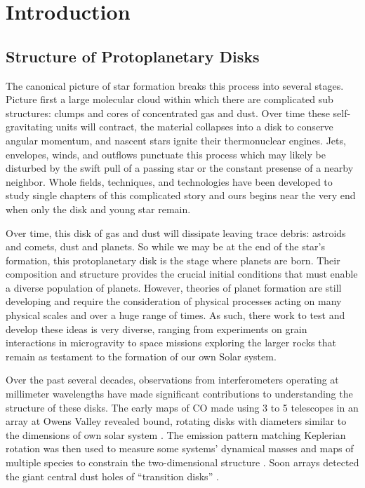 \chapter{Introduction}\label{chapter:introduction}

\section{Structure of Protoplanetary Disks}

The canonical picture of star formation breaks this process into several stages.  Picture first a large 
molecular cloud within which there are complicated sub structures: clumps and cores of 
concentrated gas and dust.  Over time these self-gravitating units will contract,  the material collapses into 
a disk to conserve angular momentum, and nascent stars ignite their thermonuclear engines.  Jets, envelopes, 
winds, and outflows punctuate this 
process which may likely be disturbed by the swift pull of a passing star or the constant presense of a nearby 
neighbor.  Whole fields, techniques, and technologies have been developed to study single chapters of this 
complicated story and ours begins near the very end when only the disk and young star remain.

Over time, this disk of gas and dust will dissipate leaving trace debris: astroids and comets, dust and planets.
So while we may be at the end of the star's formation, this protoplanetary disk is the stage where planets are
born.  Their composition and structure provides the crucial initial conditions that must enable a diverse 
population of planets.  However, theories of planet formation are still developing and require the consideration 
of physical processes acting on many physical scales and over a huge range of times.  As such, there 
work to test and develop these ideas is very diverse, ranging from experiments on grain interactions in 
microgravity to space missions exploring the larger rocks that remain as testament to the formation of our 
own Solar system.  

Over the past several decades, observations from interferometers operating at millimeter wavelengths have made
significant contributions to understanding the structure of these disks.  The early maps of CO made using 3 to 5 
telescopes in an array at 
Owens Valley revealed bound, rotating disks with diameters 
similar to the dimensions of own solar system 
\citep{sargent87,weintraub87,weintraub89,sargent91,koerner93a,koerner93b,koerner95}.  The emission pattern
matching Keplerian 
rotation was then used to measure some systems' dynamical masses 
\citep{dutrey98,guilloteau98,guilloteau99,simon00} and
maps of multiple species to constrain the two-dimensional structure 
\citep{aikawa99,aikawa01,vanzadelhoff01,aikawa02}.   Soon arrays detected the giant central dust holes of 
``transition disks''
\citep{hughes07,brown09,andrews11}.

